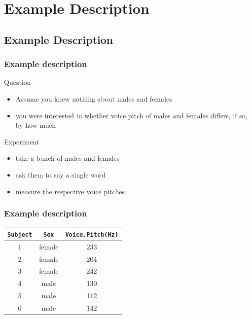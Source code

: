 \documentclass[10p]{beamer}\usepackage[]{graphicx}\usepackage[]{color}
\begin{document}
\section{Example Description}
\subsection{Example Description}

\begin{frame}
\frametitle{Example description}
Question
\begin{itemize}
\item Assume you knew nothing about males and females
\item you were interested in whether \alert{voice pitch} of males and females differs, if so, by how much
\end{itemize}

\vspace{9pt}
Experiment
\begin{itemize}
\item take a bunch of males and females
\item ask them to say a single word
\item measure the respective voice pitches
\end{itemize}

\end{frame}

\begin{frame}
\frametitle{Example description}

\begin{center}
\begin{tabular}{ccc}
\toprule
\texttt{Subject} & \texttt{Sex} & \texttt{Voice.Pitch(Hz)} \\
\midrule
1 & female & 233 \\
2 & female & 204 \\
3 & female & 242 \\
4 & male & 130 \\
5 & male & 112 \\
6 & male & 142 \\
\bottomrule
\end{tabular}
\end{center}

\end{frame}
\end{document}
